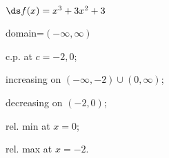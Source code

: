 {$\ds f(x) =x^3+3x^2+3$
}
{domain=$(-\infty,\infty)$

c.p. at $c=-2,0$; 

increasing on $(-\infty,-2)\cup (0,\infty)$;

decreasing on $(-2,0)$;

rel. min at $x=0$;

rel. max at $x=-2$.
}

